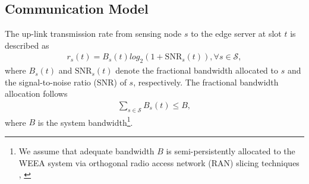 \documentclass[lettersize,journal]{IEEEtran}
\theoremstyle{custom}
\begin{document}




\subsection{Communication Model}
The up-link transmission rate from sensing node $s$ to the edge server at slot $t$ is described as
\begin{align}
    r_{s}(t) = B_s(t) log_2\left(1 + \mathrm{SNR}_s(t) \right), \forall s \in \mathcal{S}, 
\end{align}
where $B_s(t)$ and $\mathrm{SNR}_s(t)$ denote the fractional bandwidth allocated to $s$ and the signal-to-noise ratio (SNR) of $s$, respectively. The fractional bandwidth allocation follows
\begin{align}\label{bandwidth_cons}
    \sum_{s \in \mathcal{S}}B_s(t) \leq B, 
\end{align}
where $B$ is the system bandwidth\footnote{We assume that adequate bandwidth $B$ is semi-persistently allocated to the WEEA system via orthogonal radio access network (RAN) slicing techniques \cite{}, \cite{}}. 
\end{document}
